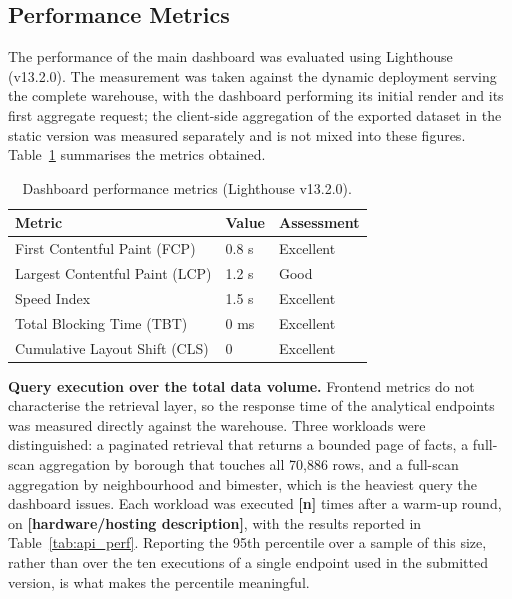 \documentclass[runningheads]{llncs}
\renewcommand{\_}{\origunderscore\allowbreak}
\newif\ifshowchanges
\newcommand{\new}[1]{\ifshowchanges\textcolor{chg}{#1}\else#1\fi}
\newenvironment{chgblock}{\ifshowchanges\color{chg}\fi}{}
\newcommand{\fillin}[1]{\textcolor{todo}{\textbf{[#1]}}}
\begin{document}
\subsection{Performance Metrics}
\label{sec:perf}

The performance of the main dashboard was evaluated using Lighthouse (v13.2.0).
\new{The measurement was taken against the dynamic deployment serving the
complete warehouse, with the dashboard performing its initial render and its
first aggregate request; the client-side aggregation of the exported dataset in
the static version was measured separately and is not mixed into these figures.}
Table~\ref{tab:lighthouse_dashboard} summarises the metrics obtained.

\begin{table}[tbp]
\centering
\caption{Dashboard performance metrics (Lighthouse v13.2.0).}
\label{tab:lighthouse_dashboard}
\begin{tabular}{@{}lll@{}}
\toprule
\textbf{Metric} & \textbf{Value} & \textbf{Assessment} \\
\midrule
First Contentful Paint (FCP)   & 0.8 s & Excellent \\
Largest Contentful Paint (LCP) & 1.2 s & Good \\
Speed Index                    & 1.5 s & Excellent \\
Total Blocking Time (TBT)      & 0 ms  & Excellent \\
Cumulative Layout Shift (CLS)  & 0     & Excellent \\
\bottomrule
\end{tabular}
\end{table}

\begin{chgblock}
\textbf{Query execution over the total data volume.} Frontend metrics do not
characterise the retrieval layer, so the response time of the analytical
endpoints was measured directly against the warehouse. Three workloads were
distinguished: a paginated retrieval that returns a bounded page of facts, a
full-scan aggregation by borough that touches all 70,886 rows, and a full-scan
aggregation by neighbourhood and bimester, which is the heaviest query the
dashboard issues. Each workload was executed \fillin{n} times after a warm-up
round, on \fillin{hardware/hosting description}, with the results reported in
Table~\ref{tab:api_perf}. Reporting the 95th percentile over a sample of this
size, rather than over the ten executions of a single endpoint used in the
submitted version, is what makes the percentile meaningful.
\end{chgblock}
\end{document}
